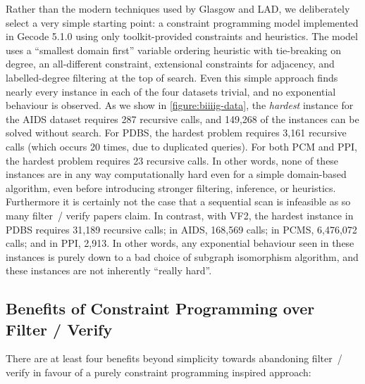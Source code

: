 \documentclass[twoside,11pt]{article}
\begin{document}
Rather than the modern techniques used by Glasgow and LAD, we deliberately select a very simple
starting point: a constraint programming model implemented in Gecode 5.1.0 using only
toolkit-provided constraints and heuristics. The model uses a ``smallest domain first'' variable
ordering heuristic with tie-breaking on degree, an all-different constraint, extensional constraints
for adjacency, and labelled-degree filtering at the top of search. Even this simple approach finds
nearly every instance in each of the four datasets trivial, and no exponential behaviour is
observed. As we show in \cref{figure:biiiig-data}, the \emph{hardest} instance for the AIDS dataset
requires 287 recursive calls, and 149,268 of the instances can be solved without search.  For PDBS,
the hardest problem requires 3,161 recursive calls (which occurs 20 times, due to duplicated
queries). For both PCM and PPI, the hardest problem requires 23 recursive calls.  In other words,
none of these instances are in any way computationally hard even for a simple domain-based
algorithm, even before introducing stronger filtering, inference, or heuristics.  Furthermore it is
certainly not the case that a sequential scan is infeasible as so many filter~/ verify papers claim.
In contrast, with VF2, the hardest instance in PDBS requires 31,189 recursive calls; in AIDS,
168,569 calls; in PCMS, 6,476,072 calls; and in PPI, 2,913. In other words, any exponential
behaviour seen in these instances is purely down to a bad choice of subgraph isomorphism algorithm,
and these instances are not inherently ``really hard''.

\subsection{Benefits of Constraint Programming over Filter / Verify}

There are at least four benefits beyond simplicity towards abandoning filter~/ verify in favour of a
purely constraint programming inspired approach:
\end{document}

